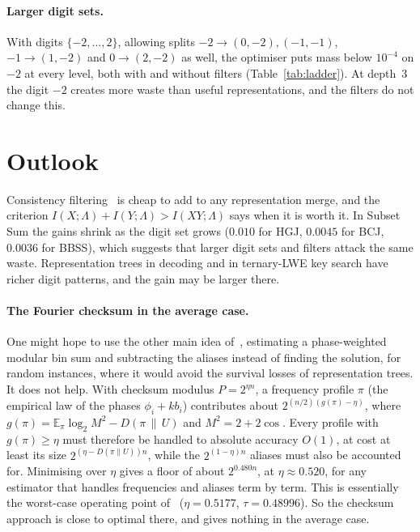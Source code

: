 \documentclass[11pt]{article}
\theoremstyle{definition}
\theoremstyle{remark}
\newcommand{\status}[1]{}   %
\begin{document}
\paragraph{Larger digit sets.} With digits $\{-2,\dots,2\}$, allowing splits $-2\to(0,-2),(-1,-1)$,
$-1\to(1,-2)$ and $0\to(2,-2)$ as well, the optimiser puts mass below $10^{-4}$ on $-2$ at every level, both with and
without filters (Table~\ref{tab:ladder}). At depth~3 the digit $-2$ creates more waste than useful representations,
and the filters do not change this.
\status{numerical; warm-started from the $\{-1,0,1,2\}$ optimum and from a point with $-2$ forced on}

\section{Outlook}
Consistency filtering~\cite{Oze16} is cheap to add to any representation merge, and the criterion
$I(X;\Lambda)+I(Y;\Lambda)>I(XY;\Lambda)$ says when it is worth it. In Subset Sum the gains shrink as the digit set
grows ($0.010$ for HGJ, $0.0045$ for BCJ, $0.0036$ for BBSS), which suggests that larger digit sets and filters
attack the same waste. Representation trees in decoding and in ternary-LWE key search have richer digit patterns,
and the gain may be larger there.

\paragraph{The Fourier checksum in the average case.} One might hope to use the other main idea of~\cite{OAI26},
estimating a phase-weighted modular bin sum and subtracting the aliases instead of finding the solution, for random
instances, where it would avoid the survival losses of representation trees. It does not help. With checksum modulus
$P=2^{\eta n}$, a frequency profile $\pi$ (the empirical law of the phases $\phi_i+kb_i$) contributes about
$2^{(n/2)(g(\pi)-\eta)}$, where $g(\pi)=\mathbb{E}_\pi\log_2 M^2-D(\pi\,\|\,U)$ and $M^2=2+2\cos$. Every profile with
$g(\pi)\ge\eta$ must therefore be handled to absolute accuracy $O(1)$, at cost at least its size
$2^{(\eta-D(\pi\|U))n}$, while the $2^{(1-\eta)n}$ aliases must also be accounted for. Minimising over $\eta$ gives a
floor of about $2^{0.480n}$, at $\eta\approx0.520$, for any estimator that handles frequencies and aliases term by
term. This is essentially the worst-case operating point of~\cite{OAI26} ($\eta=0.5177$, $\tau=0.48996$). So the
checksum approach is close to optimal there, and gives nothing in the average case.
\status{numerical; script checksum\_floor.py; model restricted to term-by-term estimators}
\end{document}
